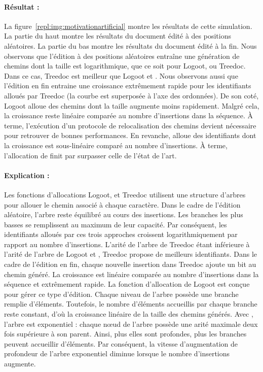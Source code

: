 \paragraph{Résultat :} La figure~\ref{repl:img:motivationartificial} montre les
résultats de cette simulation. La partie du haut montre les résultats du
document édité à des positions aléatoires. La partie du bas montre les résultats
du document édité à la fin. Nous observons que l'édition à des positions
aléatoires entraîne une génération de chemins dont la taille est logarithmique,
que ce soit pour Logoot, \LSEQ ou Treedoc. Dans ce cas, Treedoc est meilleur que
Logoot et \LSEQ. Nous observons aussi que l'édition en fin entraine une
croissance extrêmement rapide pour les identifiants alloués par Treedoc (la
courbe est superposée à l'axe des ordonnées). De son coté, Logoot alloue des
chemins dont la taille augmente moins rapidement. Malgré cela, la croissance
reste linéaire comparée au nombre d'insertions dans la séquence. À terme,
l'exécution d'un protocole de relocalisation des chemins devient nécessaire pour
retrouver de bonnes performances. En revanche, \LSEQ alloue des identifiants
dont la croissance est sous-linéaire comparé au nombre d'insertions. À terme,
l'allocation de \LSEQ finit par surpasser celle de l'état de l'art.

\paragraph{Explication :} Les fonctions d'allocations Logoot, \LSEQ et Treedoc
utilisent une structure d'arbres pour allouer le chemin associé à chaque
caractère. Dans le cadre de l'édition aléatoire, l'arbre reste équilibré au
cours des insertions. Les branches les plus basses se remplissent au maximum de
leur capacité. Par conséquent, les identifiants alloués par ces trois approches
croissent logarithmiquement par rapport au nombre d'insertions. L'arité de
l'arbre de Treedoc étant inférieure à l'arité de l'arbre de Logoot et \LSEQ,
Treedoc propose de meilleurs identifiants. Dans le cadre de l'édition en fin,
chaque nouvelle insertion dans Treedoc ajoute un bit au chemin généré. La
croissance est linéaire comparée au nombre d'insertions dans la séquence et
extrêmement rapide. La fonction d'allocation de Logoot est conçue pour gérer ce
type d'édition. Chaque niveau de l'arbre possède une branche remplie
d'éléments. Toutefois, le nombre d'éléments accueillis par chaque branche reste
constant, d'où la croissance linéaire de la taille des chemins générés. Avec
\LSEQ, l'arbre est exponentiel : chaque nœud de l'arbre possède une arité
maximale deux fois supérieure à son parent. Ainsi, plus elles sont profondes,
plus les branches peuvent accueillir d'éléments. Par conséquent, la vitesse
d'augmentation de profondeur de l'arbre exponentiel diminue lorsque le nombre
d'insertions augmente.


